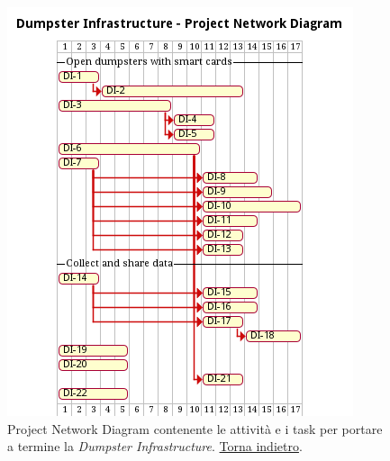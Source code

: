 \begin{figure}[H]
    \centering
    \includegraphics[width=\textwidth]{../img/gantt-dumpster-infrastructure.pm}
    \caption{Project Network Diagram contenente le attività e i task per portare a termine la \textit{Dumpster Infrastructure}. \hyperlink{back:gantt-dumpster-infrastructure}{Torna indietro}.}
    \label{fig:gantt-dumpster-infrastructure}
\end{figure}

